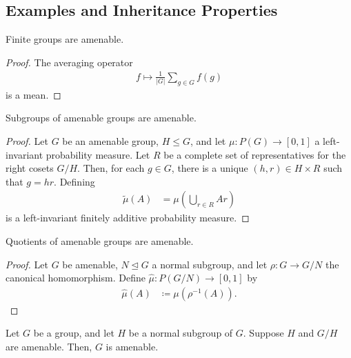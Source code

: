 \documentclass[10pt]{mypackage}
\renewcommand{\coloneq}{\coloneqq}
\begin{document}
\subsection{Examples and Inheritance Properties}%
\begin{proposition}
  Finite groups are amenable.
\end{proposition}
\begin{proof}
  The averaging operator
  \begin{align*}
    f\mapsto \frac{1}{\left\vert G \right\vert} \sum_{g\in G} f\left( g \right)
  \end{align*}
  is a mean.
\end{proof}
\begin{proposition}
  Subgroups of amenable groups are amenable.
\end{proposition}
\begin{proof}
  Let $G$ be an amenable group, $H\leq G$, and let $\mu\colon P(G)\rightarrow [0,1]$ a left-invariant probability measure. Let $R$ be a complete set of representatives for the right cosets $G/H$. Then, for each $g\in G$, there is a unique $\left( h,r \right)\in H\times R$ such that $g = hr$. Defining
  \begin{align*}
    \widetilde{\mu}\left( A \right) &= \mu\left( \bigcup_{r\in R}Ar \right)
  \end{align*}
  is a left-invariant finitely additive probability measure.
\end{proof}
\begin{proposition}
  Quotients of amenable groups are amenable.
\end{proposition}
\begin{proof}
  Let $G$ be amenable, $N\trianglelefteq G$ a normal subgroup, and let $\rho\colon G\rightarrow G/N$ the canonical homomorphism. Define $\hat{\mu}\colon P\left(G/N\right)\rightarrow [0,1]$ by
  \begin{align*}
    \hat{\mu}\left( A \right) &\coloneq \mu\left( \rho^{-1}\left( A \right) \right).
  \end{align*}
\end{proof}
\begin{proposition}
  Let $G$ be a group, and let $H$ be a normal subgroup of $G$. Suppose $H$ and $G/H$ are amenable. Then, $G$ is amenable.
\end{proposition}
\end{document}
